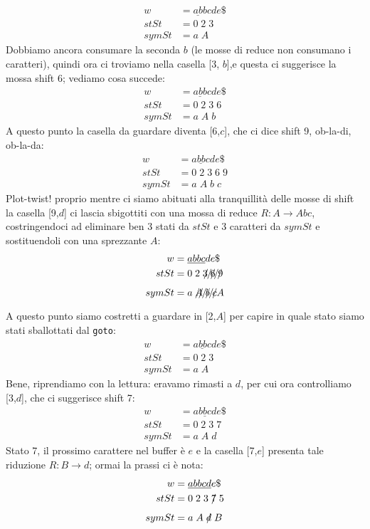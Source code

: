 \documentclass[class=book, crop=false, oneside, 12pt]{standalone}
\begin{document}
\begin{align*}
    w &= \underline{ab}bcde\$ \\
    stSt &= 0\;2\;3\\
    symSt &= a\;A
\end{align*}
Dobbiamo ancora consumare la seconda \(b\) (le mosse di reduce non consumano i caratteri), quindi ora ci troviamo nella casella [3, \(b\)],e questa ci suggerisce la mossa shift 6; vediamo cosa succede:
\begin{align*}
    w &= \underline{abb}cde\$ \\
    stSt &= 0\;2\;3\;6\\
    symSt &= a\;A\;b
\end{align*}
A questo punto la casella da guardare diventa [6,\(c\)], che ci dice shift 9, ob-la-di, ob-la-da:
\begin{align*}
    w &= \underline{abbc}de\$ \\
    stSt &= 0\;2\;3\;6\;9\\
    symSt &= a\;A\;b\;c
\end{align*}
Plot-twist! proprio mentre ci siamo abituati alla tranquillità delle mosse di shift la casella [9,\(d\)] ci lascia sbigottiti con una mossa di reduce \(R: A \to Abc\), costringendoci ad eliminare ben 3 stati da \(stSt\) e 3 caratteri da \(symSt\) e sostituendoli con una sprezzante \(A\):
\begin{align*}
    w &= \underline{abbc}de\$ \\
    stSt &= 0\;2\;\xout{3\;6\;9}\\
    symSt &= a\;\xout{A\;b\;c}A
\end{align*}
A questo punto siamo costretti a guardare in [2,\(A\)] per capire in quale stato siamo stati sballottati dal \texttt{goto}:
\begin{align*}
    w &= \underline{abbc}de\$ \\
    stSt &= 0\;2\;3\\
    symSt &= a\;A
\end{align*}
Bene, riprendiamo con la lettura: eravamo rimasti a \(d\), per cui ora controlliamo [3,\(d\)], che ci suggerisce shift 7:
\begin{align*}
    w &= \underline{abbcd}e\$ \\
    stSt &= 0\;2\;3\;7\\
    symSt &= a\;A\;d
\end{align*}
Stato 7, il prossimo carattere nel buffer è \(e\) e la casella [7,\(e\)] presenta tale riduzione \(R: B\to d\); ormai la prassi ci è nota:
\begin{align*}
    w &= \underline{abbcd}e\$ \\
    stSt &= 0\;2\;3\;\xout{7}\;5\\
    symSt &= a\;A\;\xout{d}\;B
\end{align*}
\end{document}

